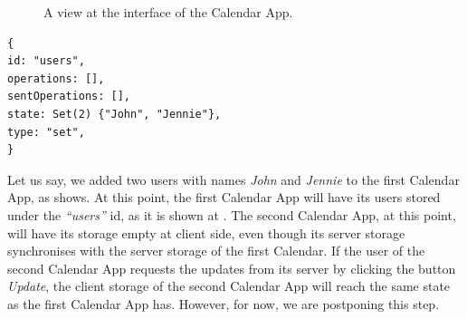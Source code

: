 \begin{figure}[!htb]
    \begin{center}
    \setlength{\fboxsep}{4pt}%
    \setlength{\fboxrule}{1pt}%
    {\scriptsize%
     }
    \caption {A view at the interface of the Calendar App.}
    \label{fig:ev-fig-2}
\end{center}
\end{figure}

\begin{lstlisting}[caption={The state of the users object store at the first Calendar App.}, label={lst:ev3}]
{
id: "users",
operations: [],
sentOperations: [],
state: Set(2) {"John", "Jennie"},
type: "set",
}
\end{lstlisting}

Let us say, we added two users with names \textit{John} and \textit{Jennie} to the first Calendar App, as  shows. At this point, the first Calendar App will have its users stored under the \textit{``users''} id, as it is shown at . The second Calendar App, at this point, will have its storage empty at client side, even though its server storage synchronises with the server storage of the first Calendar. If the user of the second Calendar App requests the updates from its server by clicking the button \textit{Update}, the client storage of the second Calendar App will reach the same state as the first Calendar App has. However, for now, we are postponing this step.

